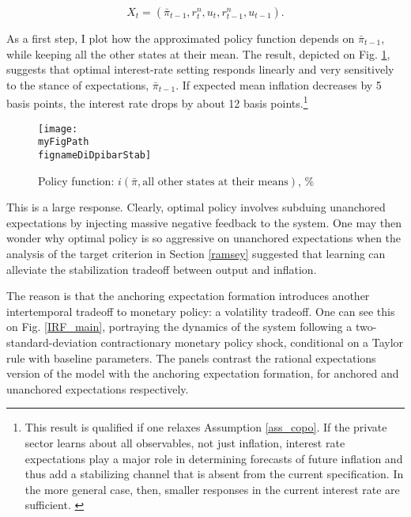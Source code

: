 \documentclass[11pt]{article}
\def \myFigPath {../../figures/}
\renewcommand{\[}{\begin{equation}}
\renewcommand{\]}{\end{equation}}
\def\movepibar{5 }
\def\movei{12 }
\def\fignameDiDpibar{analyze_opt_policy_ip17_Sep_2020}
\def\fignameDiDpibarStab{analyze_opt_policy_ip25_Sep_2020}
\begin{document}
\begin{equation}
X_t = (\bar{\pi}_{t-1}, r^n_t, u_t, r^n_{t-1}, u_{t-1}).
\end{equation}

As a first step, I plot how the approximated policy function depends on $\bar{\pi}_{t-1}$, while keeping all the other states at their mean. The result, depicted on Fig. \ref{di}, suggests that optimal interest-rate setting responds linearly and very sensitively to the stance of expectations, $\bar{\pi}_{t-1}$. If expected mean inflation decreases by \movepibar basis points, the interest rate drops by about \movei basis points.\footnote{This result is qualified if one relaxes Assumption \ref{ass_copo}. If the private sector learns about all observables, not just inflation, interest rate expectations play a major role in determining forecasts of future inflation and thus add a stabilizing channel that is absent from the current specification. In the more general case, then, smaller responses in the current interest rate are sufficient. \label{footnote_why_nonstationary}} 

\begin{figure}[h!]
\texttt{[image: \\myFigPath \\fignameDiDpibarStab]}
\caption{Policy function: $i(\bar{\pi}, \text{all other states at their means})$, \%}
\label{di}
\end{figure}

This is a large response. Clearly, optimal policy involves subduing unanchored expectations by injecting massive negative feedback to the system. One may then wonder why optimal policy is so aggressive on unanchored expectations when the analysis of the target criterion in Section \ref{ramsey} suggested that learning can alleviate the stabilization tradeoff between output and inflation. 

The reason is that the anchoring expectation formation introduces another intertemporal tradeoff to monetary policy: a volatility tradeoff. One can see this on Fig. \ref{IRF_main}, portraying the dynamics of the system following a two-standard-deviation contractionary monetary policy shock, conditional on a Taylor rule with baseline parameters. The panels contrast the rational expectations version of the model with the anchoring expectation formation, for anchored and unanchored expectations respectively. 
\end{document}
